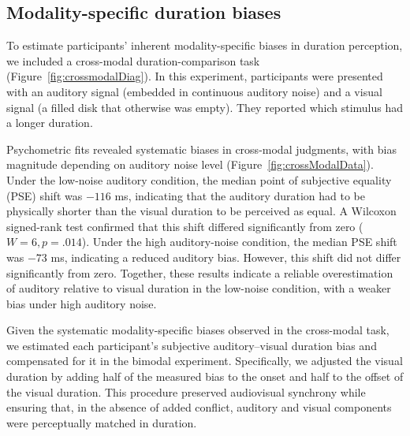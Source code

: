 \documentclass[9pt,lineno,doublespacing]{elife}
\begin{document}
\subsection{Modality-specific duration biases}

To estimate participants' inherent modality-specific biases in duration perception, we included a cross-modal duration-comparison task (Figure~\ref{fig:crossmodalDiag}). In this experiment, participants were presented with an auditory signal (embedded in continuous auditory noise) and a visual signal (a filled disk that otherwise was empty). They reported which stimulus had a longer duration.


Psychometric fits revealed systematic biases in cross-modal judgments, with bias magnitude depending on auditory noise level (Figure~\ref{fig:crossModalData}). Under the low-noise auditory condition, the median point of subjective equality (PSE) shift was $-116$ ms, indicating that the auditory duration had to be physically shorter than the visual duration to be perceived as equal. A Wilcoxon signed-rank test confirmed that this shift differed significantly from zero ($W = 6, p = .014$). Under the high auditory-noise condition, the median PSE shift was $-73$ ms, indicating a reduced auditory bias. However, this shift did not differ significantly from zero. Together, these results indicate a reliable overestimation of auditory relative to visual duration in the low-noise condition, with a weaker bias under high auditory noise.


Given the systematic modality-specific biases observed in the cross-modal task, we estimated each participant’s subjective auditory–visual duration bias and compensated for it in the bimodal experiment. Specifically, we adjusted the visual duration by adding half of the measured bias to the onset and half to the offset of the visual duration. This procedure preserved audiovisual synchrony while ensuring that, in the absence of added conflict, auditory and visual components were perceptually matched in duration. 
\end{document}
